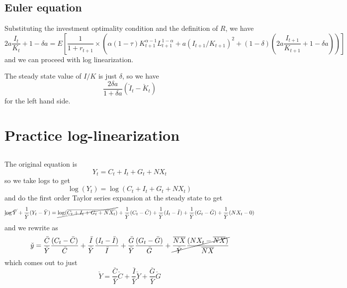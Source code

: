 \documentclass[11pt]{amsart}
\begin{document}
\subsection{Euler equation}

Substituting the investment optimality condition and the definition of $R$, we have
\[
2a \frac{I_t}{K_t} + 1 - \delta a = E\left[ \frac{1}{1+r_{t+1}} \times (\alpha (1-\tau) K_{t+1}^{\alpha-1} L_{t+1}^{1-\alpha} + a(I_{t+1} / K_{t+1})^2 + (1-\delta) (2a \frac{I_{t+1}}{K_{t+1}} + 1 - \delta a) )\right]
\]
and we can proceed with log linearization.

The steady state value of $I/K$ is just $\delta$, so we have
\[
\frac{2 \delta a}{1 + \delta a} (\check{I}_t - \check{K}_t)
\]
for the left hand side.


\section{Practice log-linearization}

\subsection{}
The original equation is
\[
Y_t = C_t + I_t + G_t + NX_t
\]
so we take logs to get
\[
\log(Y_t) = \log(C_t + I_t + G_t + NX_t)
\]
and do the first order Taylor series expansion at the steady state to get
\[
\cancel{\log \bar{Y}} + \frac{1}{\bar{Y}} (Y_t - \bar{Y}) = \cancel{\log(\overline{C_t + I_t + G_t + NX_t})} + \frac{1}{\bar{Y}} (C_t - \bar{C}) + \frac{1}{\bar{Y}} (I_t - \bar{I}) + \frac{1}{\bar{Y}} (G_t - \bar{G}) + \frac{1}{\bar{Y}} (NX_t - 0)
\]
and we rewrite as
\[
\check{y} = \frac{\bar{C}}{\bar{Y}} \frac{(C_t - \bar{C})}{\bar{C}} + \frac{\bar{I}}{\bar{Y}} \frac{(I_t - \bar{I})}{\bar{I}} + \frac{\bar{G}}{\bar{Y}} \frac{(G_t - \bar{G})}{\bar{G}} + \cancel{\frac{\overline{NX}}{\bar{Y}} \frac{(NX_t - \overline{NX})}{\overline{NX}}}
\]
which comes out to just
\[
\check{Y} = \frac{\bar{C}}{\bar{Y}} \check{C} + \frac{\bar{I}}{\bar{Y}} \check{Y} + \frac{\bar{G}}{\bar{Y}} \check{G}
\]
\end{document}
